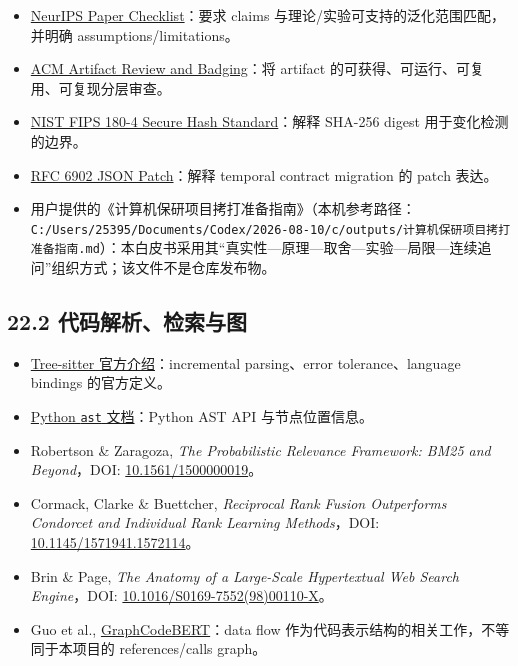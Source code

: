 \documentclass[UTF8,12pt,openany]{ctexbook}
\begin{document}
\begin{itemize}
\item \href{https://neurips.cc/public/guides/PaperChecklist}{NeurIPS Paper Checklist}：要求 claims 与理论/实验可支持的泛化范围匹配，并明确 assumptions/limitations。
\item \href{https://www.acm.org/publications/policies/artifact-review-and-badging-current}{ACM Artifact Review and Badging}：将 artifact 的可获得、可运行、可复用、可复现分层审查。
\item \href{https://csrc.nist.gov/pubs/fips/180-4/upd1/final}{NIST FIPS 180-4 Secure Hash Standard}：解释 SHA-256 digest 用于变化检测的边界。
\item \href{https://www.rfc-editor.org/rfc/rfc6902}{RFC 6902 JSON Patch}：解释 temporal contract migration 的 patch 表达。
\item 用户提供的《计算机保研项目拷打准备指南》（本机参考路径：\texttt{C:/Users/25395/Documents/Codex/2026-08-10/c/outputs/计算机保研项目拷打准备指南.md}）：本白皮书采用其“真实性—原理—取舍—实验—局限—连续追问”组织方式；该文件不是仓库发布物。
\end{itemize}

\subsection{22.2 代码解析、检索与图}

\begin{itemize}
\item \href{https://tree-sitter.github.io/tree-sitter/}{Tree-sitter 官方介绍}：incremental parsing、error tolerance、language bindings 的官方定义。
\item \href{https://docs.python.org/3/library/ast.html}{Python \texttt{ast} 文档}：Python AST API 与节点位置信息。
\item Robertson \& Zaragoza, \emph{The Probabilistic Relevance Framework: BM25 and Beyond}，DOI: \href{https://doi.org/10.1561/1500000019}{10.1561/1500000019}。
\item Cormack, Clarke \& Buettcher, \emph{Reciprocal Rank Fusion Outperforms Condorcet and Individual Rank Learning Methods}，DOI: \href{https://doi.org/10.1145/1571941.1572114}{10.1145/1571941.1572114}。
\item Brin \& Page, \emph{The Anatomy of a Large-Scale Hypertextual Web Search Engine}，DOI: \href{https://doi.org/10.1016/S0169-7552\%2898\%2900110-X}{10.1016/S0169-7552(98)00110-X}。
\item Guo et al., \href{https://arxiv.org/abs/2009.08366}{GraphCodeBERT}：data flow 作为代码表示结构的相关工作，不等同于本项目的 references/calls graph。
\end{itemize}
\end{document}
